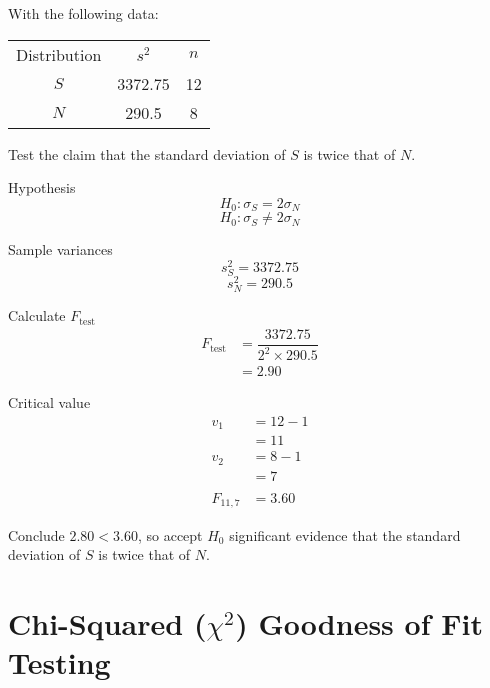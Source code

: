         \begin{example}
        {
            With the following data:
            \begin{center}
            \begin{tabular}{c|c|c}
            Distribution & $s^2$ & $n$ \\
            $S$ & 3372.75 & 12 \\
            $N$ & 290.5 & 8 \\
            \end{tabular}
            \end{center}
            Test the claim that the standard deviation of $S$ is twice that of $N$.
        }
        
        \begin{step}{Hypothesis}
            $$ H_0: \sigma_S = 2 \sigma_N $$
            $$ H_0: \sigma_S \ne 2 \sigma_N $$
        \end{step}

        \begin{step}{Sample variances}
            $$s_S^2 = 3372.75$$
            $$s_N^2 = 290.5$$
        \end{step}

        \begin{step}{Calculate $F_\text{test}$}
            \begin{align*}
                F_\text{test} &= \dfrac{3372.75}{2^2 \times 290.5}  \\
                              &= 2.90
            \end{align*}
        \end{step}

        \begin{step}{Critical value}
            \begin{align*}
            v_1 &= 12 - 1       \\
                &= 11           \\
            v_2 &= 8 - 1        \\
                &= 7            \\\\
            F_{11, 7} &= 3.60
            \end{align*}
        \end{step}

        \begin{step}{Conclude}
            $2.80 < 3.60$, so accept $H_0$ significant evidence that the standard deviation of $S$ is twice that of $N$.
        \end{step}

        \end{example}

\section{Chi-Squared ($\chi^2$) Goodness of Fit Testing}
